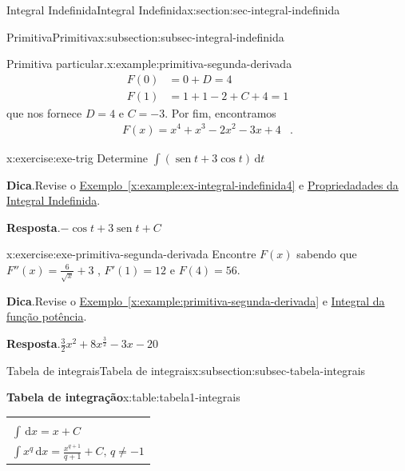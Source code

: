 \documentclass[oneside,10pt,]{article}
\newcommand{\blocktitlefont}{\relax}
\newcommand{\tabularfont}{\relax}
\newcommand{\xreffont}{\relax}
\numberwithin{equation}{section}
\newcommand{\hrulethin}  {\noalign{\hrule height 0.04em}}
\newcommand{\hrulethick} {\noalign{\hrule height 0.11em}}
\newcommand{\dd}{\mathrm{d}}
\newcommand{\integral}[2]{\displaystyle\int {#1}\,\dd {#2}}
\DeclareMathOperator{\sin}{sen}
\newcommand{\amp}{&}
\begin{document}
\begin{sectionptx}{Integral Indefinida}{}{Integral Indefinida}{}{}{x:section:sec-integral-indefinida}
\begin{subsectionptx}{Primitiva}{}{Primitiva}{}{}{x:subsection:subsec-integral-indefinida}
\begin{example}{Primitiva particular.}{x:example:primitiva-segunda-derivada}
\begin{align*}
F(0)  \amp = 0+D =4 \\
F(1) \amp = 1+ 1-2+C+4=1 
\end{align*}
que nos fornece \(D=4\) e \(C=-3\). Por fim, encontramos%
\begin{align*}
F(x) = x^4+ x^3-2x^2-3x+4 \amp \text{.}
\end{align*}
%
\end{example}
\begin{inlineexercise}{}{x:exercise:exe-trig}%
Determine \(\integral{\left(\sin{t}+3\cos{t}\right)}{t}\)%
\par\smallskip%
\noindent\textbf{\blocktitlefont Dica}.\hypertarget{g:hint:idp25}{}\quad{}Revise o \hyperref[x:example:ex-integral-indefinida4]{Exemplo~{\xreffont\ref{x:example:ex-integral-indefinida4}}} e \hyperref[x:assemblage:thm-prop-integral-indefinida]{Propriedadades da Integral Indefinida}.%
\par\smallskip%
\noindent\textbf{\blocktitlefont Resposta}.\hypertarget{g:answer:idp26}{}\quad{}\(-\cos{t} + 3\sin{t} + C\)%
\end{inlineexercise}%
\begin{inlineexercise}{}{x:exercise:exe-primitiva-segunda-derivada}%
Encontre \(F(x)\) sabendo que \(F''(x)=\frac{6}{\sqrt{x}} + 3\) , \(F'(1)=12\) e \(F(4)=56\).%
\par\smallskip%
\noindent\textbf{\blocktitlefont Dica}.\hypertarget{g:hint:idp27}{}\quad{}Revise  o \hyperref[x:example:primitiva-segunda-derivada]{Exemplo~{\xreffont\ref{x:example:primitiva-segunda-derivada}}} e \hyperref[x:assemblage:prob-integral-funcao-potencia]{Integral da função potência}.%
\par\smallskip%
\noindent\textbf{\blocktitlefont Resposta}.\hypertarget{g:answer:idp28}{}\quad{}\(\frac{3}{2}x^{2} + 8x^{\frac{3}{2}} - 3x - 20\)%
\end{inlineexercise}%
\end{subsectionptx}
%
%
\typeout{************************************************}
\typeout{************************************************}
%
\begin{subsectionptx}{Tabela de integrais}{}{Tabela de integrais}{}{}{x:subsection:subsec-tabela-integrais}
\begin{tableptx}{\textbf{Tabela de integração}}{x:table:tabela1-integrais}{}%
\centering%
{\tabularfont%
\begin{tabular}{l}\hrulethick
\multicolumn{1}{c}{Fórmula}\tabularnewline\hrulethin
\(\integral{}{x}=x+ C\)\tabularnewline[0pt]
\(\integral{x^q}{x}=\frac{x^{q+1}}{q+1} + C,\,q\neq -1\)\tabularnewline[0pt]

\end{tabular}}
\end{tableptx}
\end{subsectionptx}
\end{sectionptx}
\end{document}
